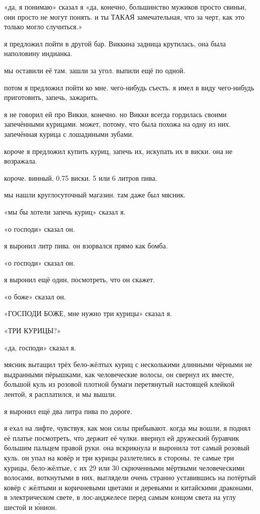 «да, я понимаю» сказал я «да, конечно, большинство мужиков просто свиньи,
они просто не могут понять.
и ты ТАКАЯ замечательная, что за черт, как это
только могло случиться.»

я предложил пойти в другой бар.
Виккина задница крутилась, она была 
наполовину индианка.

мы оставили её там.
зашли за угол.
выпили ещё по одной.

потом я предложил пойти ко мне.
чего-нибудь съесть.
я имел в виду чего-нибудь 
приготовить, запечь, зажарить.

я не говорил ей про Викки, конечно.
но Викки всегда гордилась своими 
запечёнными курицами.
может, потому, что была похожа на одну из них.
запечённая 
курица с лошадиными зубами.

короче я предложил купить куриц, запечь их, искупать их в виски.
она не
возражала.

короче.
винный.
0.75 виски.
5 или 6 литров пива.

мы нашли круглосуточный магазин.
там даже был мясник.

«мы бы хотели запечь куриц» сказал я.

«о господи» сказал он.

я выронил литр пива.
он взорвался прямо как бомба.

«о господи» сказал он.

я выронил ещё один, посмотреть, что он скажет.

«о боже» сказал он.

«ГОСПОДИ БОЖЕ, мне нужно три курицы» сказал я.

«ТРИ КУРИЦЫ?»

«да, господи» сказал я.

мясник вытащил трёх бело-жёлтых куриц с несколькими длинными чёрными
не выдранными пёрышками, как человеческие волосы, он
свернул их вместе, большой куль из розовой плотной бумаги перетянутый
настоящей клейкой лентой, я расплатился, и мы вышли.

я выронил ещё два литра пива по дороге.

я ехал на лифте, чувствуя, как мои силы прибывают.
когда мы вошли, я поднял её 
платье посмотреть, что держит её чулки.
ввернул ей дружеский буравчик большим 
пальцем правой руки.
она вскрикнула и выронила тот самый розовый куль.
он упал на 
ковёр и три курицы разлетелись в стороны.
те самые три курицы, бело-жёлтые, 
с их 29 или 30 скрюченными мёртвыми человеческими волосами, воткнутыми в них,
выглядели очень странно уставившись на потёртый ковёр с жёлтыми и 
коричневыми цветами и деревьями и китайскими драконами, в электрическом 
свете, в лос-анджелесе перед самым концом света на углу шестой и \'{ю}нион.

